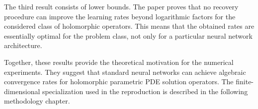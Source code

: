 The third result consists of lower bounds. The paper proves that no recovery procedure can improve the learning rates beyond logarithmic factors for the considered class of holomorphic operators. This means that the obtained rates are essentially optimal for the problem class, not only for a particular neural network architecture.

Together, these results provide the theoretical motivation for the numerical experiments. They suggest that standard neural networks can achieve algebraic convergence rates for holomorphic parametric PDE solution operators. The finite-dimensional specialization used in the reproduction is described in the following methodology chapter. 
